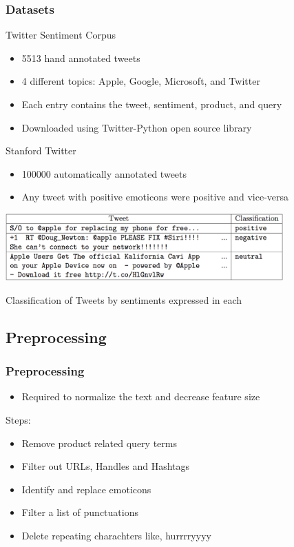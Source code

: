 \documentclass{beamer}
\begin{document}
\begin{frame}
\frametitle{Datasets}

Twitter Sentiment Corpus
	\begin{itemize}
		\item 5513 hand annotated tweets
		\item 4 different topics: Apple, Google, Microsoft, and Twitter
		\item Each entry contains the tweet, sentiment, product, and query
		\item Downloaded using Twitter-Python open source library
	\end{itemize}

Stanford Twitter
	\begin{itemize}
		\item 100000 automatically annotated tweets
		\item Any tweet with positive emoticons were positive and vice-versa
	\end{itemize}

\begin{table}[h]
\centering
\includegraphics[width=0.8\textwidth]{img/table_tweets.png}
\caption{Classification of Tweets by sentiments expressed in each}
\label{table:twt}
\end{table}

\end{frame}

\subsection{Preprocessing}

\begin{frame}
\frametitle{Preprocessing}
\begin{itemize}
\item Required to normalize the text and decrease feature size
\end{itemize}
Steps:
\begin{itemize}
\item Remove product related query terms
\item Filter out URLs, Handles and Hashtags
\item Identify and replace emoticons
\item Filter a list of punctuations
\item Delete repeating charachters like, hurrrryyyy
\end{itemize}

\end{frame}
\end{document}
